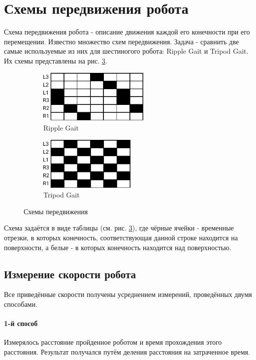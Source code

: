 \documentclass{article}
\begin{document}
\section{Схемы передвижения робота}
Схема передвижения робота - описание движения каждой его конечности при его перемещении. Известно множество схем передвижения. Задача - сравнить две самые используемые из них для шестиногого робота: Ripple Gait и Tripod Gait. Их схемы представлены на рис. \ref{fig:gaits}.

\begin{figure}[h]
	\begin{subfigure}[b]{0.5\linewidth}
		\centering
		\includegraphics[height=7em]{ripple_gait}
		\caption{Ripple Gait}
		\label{fig:ripple_gait}
	\end{subfigure}
	\hfill
	\begin{subfigure}[b]{0.5\linewidth}
		\centering
		\includegraphics[height=7em]{tripod_gait}
		\caption{Tripod Gait}
		\label{fig:tripod_gait}
	\end{subfigure}
	\caption{Схемы передвижения}
	\label{fig:gaits}
\end{figure}

Схема задаётся в виде таблицы (см. рис. \ref{fig:gaits}), где чёрные ячейки - временные отрезки, в которых конечность, соответствующая данной строке находится на поверхности, а белые - в которых конечность находится над поверхностью.

\subsection{Измерение скорости робота}
Все приведённые скорости получены усреднением измерений, проведённых двумя способами.

\paragraph*{1-й способ}
Измерялось расстояние пройденное роботом и время прохождения этого расстояния. Результат получался путём деления расстояния на затраченное время.
\end{document}

